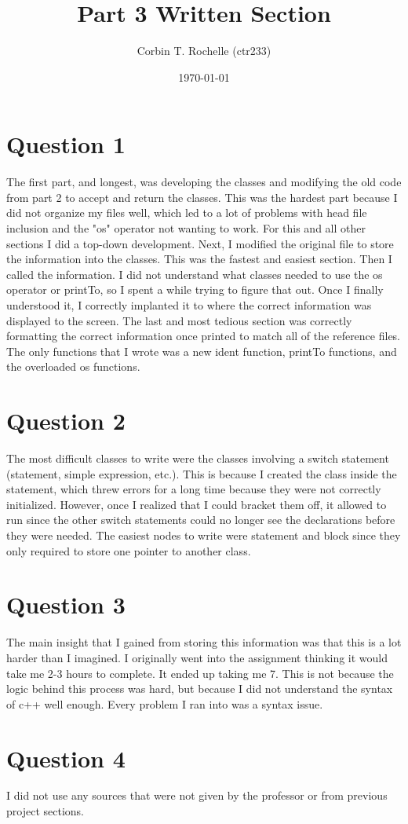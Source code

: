 \documentclass{article}
\title{Part 3 Written Section}
\author{Corbin T. Rochelle (ctr233)}
\date{\today}
\begin{document}
\maketitle

\section*{Question 1}
The first part, and longest, was developing the classes and modifying the old code from part 2 to accept and return the classes.
This was the hardest part because I did not organize my files well, which led to a lot of problems with head file inclusion and the "os" operator not wanting to work. 
For this and all other sections I did a top-down development.
Next, I modified the original file to store the information into the classes. 
This was the fastest and easiest section.
Then I called the information.
I did not understand what classes needed to use the os operator or printTo, so I spent a while trying to figure that out.
Once I finally understood it, I correctly implanted it to where the correct information was displayed to the screen.
The last and most tedious section was correctly formatting the correct information once printed to match all of the reference files. 
The only functions that I wrote was a new ident function, printTo functions, and the overloaded os functions. 

\section*{Question 2}
The most difficult classes to write were the classes involving a switch statement (statement, simple expression, etc.).
This is because I created the class inside the statement, which threw errors for a long time because they were not correctly initialized. 
However, once I realized that I could bracket them off, it allowed to run since the other switch statements could no longer see the declarations before they were needed. 
The easiest nodes to write were statement and block since they only required to store one pointer to another class.  

\section*{Question 3}
The main insight that I gained from storing this information was that this is a lot harder than I imagined. 
I originally went into the assignment thinking it would take me 2-3 hours to complete.
It ended up taking me 7.
This is not because the logic behind this process was hard, but because I did not understand the syntax of c++ well enough.
Every problem I ran into was a syntax issue.

\section*{Question 4}
I did not use any sources that were not given by the professor or from previous project sections. 
\end{document}
